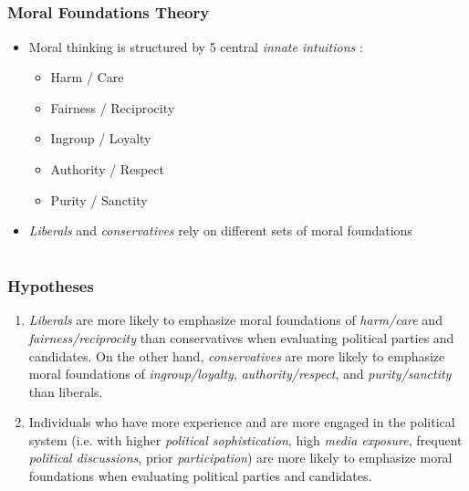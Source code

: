 \documentclass{beamer}
\begin{document}
\subsection{}
\begin{frame}%
  \frametitle{Moral Foundations Theory}
  \begin{itemize}
    \item Moral thinking is structured by 5 central \emph{innate intuitions} \citep{haidt2008moral}:
    \begin{itemize}
      \item Harm / Care
      \item Fairness / Reciprocity
      \item Ingroup / Loyalty
      \item Authority / Respect
      \item Purity / Sanctity
    \end{itemize}
    \item \emph{Liberals} and \emph{conservatives} rely on different sets of moral foundations \citep[e.g][]{graham2009liberals,haidt2007morality}
  \end{itemize}
\end{frame}

\section{}
\subsection{}
\begin{frame}%
  \frametitle{Hypotheses}
  \begin{enumerate}
    \item \emph{Liberals} are more likely to emphasize moral foundations of \emph{harm/care} and \emph{fairness/reciprocity} than conservatives when evaluating political parties and candidates. On the other hand, \emph{conservatives} are more likely to emphasize moral foundations of \emph{ingroup/loyalty}, \emph{authority/respect}, and \emph{purity/sanctity} than liberals.
    \item Individuals who have more experience and are more engaged in the political system (i.e. with higher \emph{political sophistication}, high \emph{media exposure}, frequent \emph{political discussions}, prior \emph{participation}) are more likely to emphasize moral foundations when evaluating political parties and candidates.
  \end{enumerate}
\end{frame}
\end{document}
